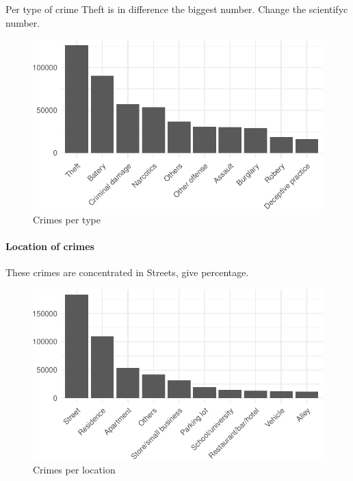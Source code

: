 \documentclass[]{article}
\let\oldparagraph\paragraph
\renewcommand{\paragraph}[1]{\oldparagraph{#1}\mbox{}}
\begin{document}
Per type of crime Theft is in difference the biggest number. Change the
scientifyc number.

\begin{figure}[H]

{\centering \includegraphics{Assessment_1v8_files/figure-latex/fig6-1} 

}

\caption{Crimes per type}\label{fig:fig6}
\end{figure}

\paragraph{Location of crimes}\label{location-of-crimes}

These crimes are concentrated in Streets, give percentage.

\begin{figure}[H]

{\centering \includegraphics{Assessment_1v8_files/figure-latex/fig7-1} 

}

\caption{Crimes per location}\label{fig:fig7}
\end{figure}
\end{document}
